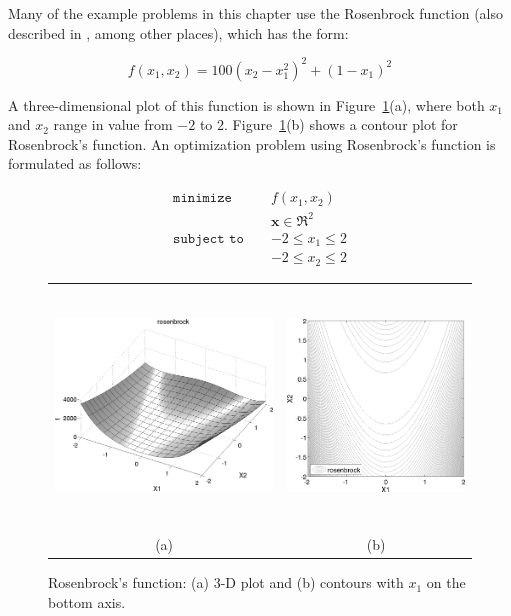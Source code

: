Many of the example problems in this chapter use the Rosenbrock
function \cite{Rosenbrock60} (also described in \cite{Gil81}, among
other places), which has the form:

\begin{equation}
f(x_1,x_2)=100(x_2-x_1^2)^2+(1-x_1)^2 \label{tutorial:rosen}
\end{equation}

A three-dimensional plot of this function is shown in
Figure~\ref{tutorial:rosenbrock_prob}(a), where both $x_1$ and
$x_2$ range in value from $-2$ to $2$.
Figure~\ref{tutorial:rosenbrock_prob}(b) shows a contour plot
for Rosenbrock's function. An optimization problem using Rosenbrock's
function is formulated as follows:

\begin{eqnarray}
\texttt{minimize }   & & f(x_1,x_2)          \nonumber\\
                     & & \mathbf{x} \in \Re^2\nonumber\\
\texttt{subject to } & & -2 \le x_1 \le 2    \\
                     & & -2 \le x_2 \le 2    \nonumber
\end{eqnarray}

\begin{figure}[htp!]
  \centering
  \begin{tabular}{cc}
  \includegraphics[height=2.5in]{images/rosen_3d_surf} &
  \includegraphics[height=2.5in]{images/rosen_2d_surf} \\
  (a) & (b) \\
  \end{tabular}
  \caption{Rosenbrock's function: (a) 3-D plot and (b) contours with
  $x_1$ on the bottom axis.}
  \label{tutorial:rosenbrock_prob}
\end{figure}

